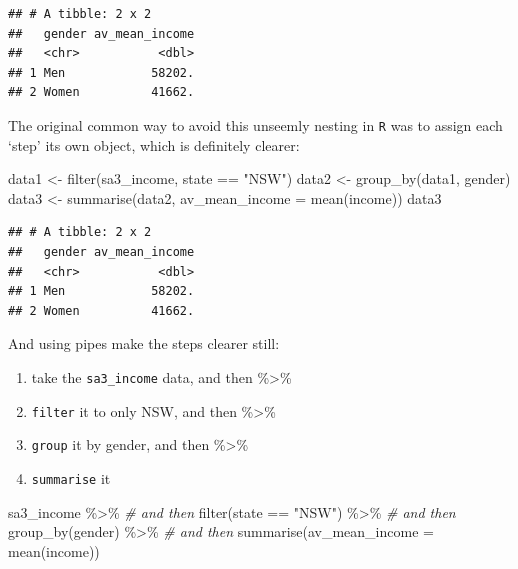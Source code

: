 \documentclass[
]{book}
\newenvironment{Shaded}{\begin{snugshade}}{\end{snugshade}}
\newcommand{\AttributeTok}[1]{\textcolor[rgb]{0.77,0.63,0.00}{#1}}
\newcommand{\CommentTok}[1]{\textcolor[rgb]{0.56,0.35,0.01}{\textit{#1}}}
\newcommand{\FunctionTok}[1]{\textcolor[rgb]{0.00,0.00,0.00}{#1}}
\newcommand{\NormalTok}[1]{#1}
\newcommand{\OtherTok}[1]{\textcolor[rgb]{0.56,0.35,0.01}{#1}}
\newcommand{\SpecialCharTok}[1]{\textcolor[rgb]{0.00,0.00,0.00}{#1}}
\newcommand{\StringTok}[1]{\textcolor[rgb]{0.31,0.60,0.02}{#1}}
\providecommand{\tightlist}{%
  \setlength{\itemsep}{0pt}\setlength{\parskip}{0pt}}
\begin{document}
\begin{verbatim}
## # A tibble: 2 x 2
##   gender av_mean_income
##   <chr>           <dbl>
## 1 Men            58202.
## 2 Women          41662.
\end{verbatim}

The original common way to avoid this unseemly nesting in \texttt{R} was to assign each `step' its own object, which is definitely clearer:

\begin{Shaded}
\begin{Highlighting}[]
\NormalTok{data1 }\OtherTok{\textless{}{-}} \FunctionTok{filter}\NormalTok{(sa3\_income, state }\SpecialCharTok{==} \StringTok{"NSW"}\NormalTok{)}
\NormalTok{data2 }\OtherTok{\textless{}{-}} \FunctionTok{group\_by}\NormalTok{(data1, gender)}
\NormalTok{data3 }\OtherTok{\textless{}{-}} \FunctionTok{summarise}\NormalTok{(data2, }\AttributeTok{av\_mean\_income =} \FunctionTok{mean}\NormalTok{(income))}
\NormalTok{data3}
\end{Highlighting}
\end{Shaded}

\begin{verbatim}
## # A tibble: 2 x 2
##   gender av_mean_income
##   <chr>           <dbl>
## 1 Men            58202.
## 2 Women          41662.
\end{verbatim}

And using pipes make the steps clearer still:

\begin{enumerate}
\def\labelenumi{\arabic{enumi}.}
\tightlist
\item
  take the \texttt{sa3\_income} data, and then \%\textgreater\%
\item
  \texttt{filter} it to only NSW, and then \%\textgreater\%
\item
  \texttt{group} it by gender, and then \%\textgreater\%
\item
  \texttt{summarise} it
\end{enumerate}

\begin{Shaded}
\begin{Highlighting}[]
\NormalTok{sa3\_income }\SpecialCharTok{\%\textgreater{}\%}  \CommentTok{\# and then}
  \FunctionTok{filter}\NormalTok{(state }\SpecialCharTok{==} \StringTok{"NSW"}\NormalTok{) }\SpecialCharTok{\%\textgreater{}\%} \CommentTok{\# and then }
  \FunctionTok{group\_by}\NormalTok{(gender) }\SpecialCharTok{\%\textgreater{}\%} \CommentTok{\# and then}
  \FunctionTok{summarise}\NormalTok{(}\AttributeTok{av\_mean\_income =} \FunctionTok{mean}\NormalTok{(income))}
\end{Highlighting}
\end{Shaded}
\end{document}
